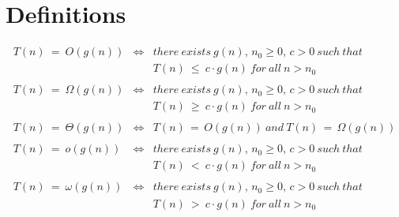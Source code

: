 
{\chapter{Definitions}}

\begin{eqnarray*}
T(n) \ = \ O(g(n))  & \Longleftrightarrow  &
     {\mathit{there\ exists}} \ g(n), \, n_0 \ge 0, \, c > 0
     \ {\mathit{such\ that}} \\
&  & T(n) \ \le \ c{\cdot}g(n)
     \ {\mathit{for\ all}} \ n > n_0 \\
&  & \\
T(n) \ = \ \Omega(g(n))  & \Longleftrightarrow  &
     {\mathit{there\ exists}} \ g(n), \, n_0 \ge 0, \, c > 0
     \ {\mathit{such\ that}} \\
&  & T(n) \ \ge \ c{\cdot}g(n)
     \ {\mathit{for\ all}} \ n > n_0 \\
&  & \\
T(n) \ = \ \Theta(g(n))  & \Longleftrightarrow  &
     T(n) \, = \, O(g(n)) \ {\mathit{and}} \ T(n) \, = \, \Omega(g(n)) \\
&  & \\
T(n) \ = \ o(g(n))  & \Longleftrightarrow  &
     {\mathit{there\ exists}} \ g(n), \, n_0 \ge 0, \, c > 0
     \ {\mathit{such\ that}} \\
&  & T(n) \ < \ c{\cdot}g(n)
     \ {\mathit{for\ all}} \ n > n_0 \\
&  & \\
T(n) \ = \ \omega(g(n))  & \Longleftrightarrow  &
     {\mathit{there\ exists}} \ g(n), \, n_0 \ge 0, \, c > 0
     \ {\mathit{such\ that}} \\
&  & T(n) \ > \ c{\cdot}g(n)
     \ {\mathit{for\ all}} \ n > n_0 \\
\end{eqnarray*}

